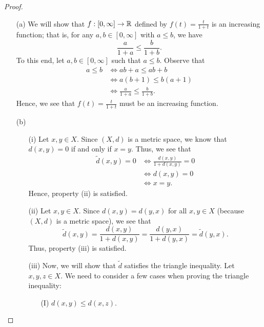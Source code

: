 \documentclass[a4paper]{article}
\begin{document}
\begin{proof}
\begin{enumerate}
    \item[(a)] We will show that \( f: [0,\infty ] \to \mathbb{R}  \) defined by \( f(t) = \frac{ t  }{  1 + t }  \) is an increasing function; that is, for any \( a,b \in [0,\infty ] \) with \( a \leq b  \), we have
        \[  \frac{  a  }{ 1 + a  }  \leq \frac{ b  }{ 1 + b }. \]
        To this end, let \( a,b \in [0,\infty ] \) such that \( a \leq b  \). Observe that
            \begin{align*}
                a \leq  b  &\Longleftrightarrow ab + a \leq ab +  b  \\
                        &\Longleftrightarrow a (b + 1) \leq b (a + 1) \\
                        &\Longleftrightarrow \frac{ a  }{ 1 + a  }  \leq \frac{ b }{  1 + b } .
            \end{align*}
            Hence, we see that \( f(t) = \frac{ t }{ 1+ t }  \) must be an increasing function.
        \item[(b)] 
            \begin{enumerate}
        \item[(i)] Let \( x,y \in X  \). Since \( (X,d) \) is a metric space, we know that \( d(x,y) = 0  \) if and only if \( x = y  \). Thus, we see that  
            \begin{align*}
                \tilde{d}(x,y) = 0 &\Longleftrightarrow \frac{ d(x,y) }{ 1 + d(x,y)  } = 0 \\
                           &\Longleftrightarrow d(x,y) = 0 \\
                           &\Longleftrightarrow x = y.
            \end{align*}
            Hence, property (ii) is satisfied.
        \item[(ii)] Let \( x,y \in X  \). Since \( d(x,y) = d(y,x) \) for all \( x,y \in X  \) (because \( (X,d) \) is a metric space), we see that  
            \[ \tilde{d}(x,y) = \frac{ d(x,y) }{ 1 + d(x,y) } = \frac{ d(y,x) }{ 1 + d(y,x) }  = \tilde{d}(y,x).  \]
            Thus, property (iii) is satisfied.
        \item[(iii)] Now, we will show that \( \tilde{d} \) satisfies the triangle inequality. Let \( x,y,z \in X  \).
We need to consider a few cases when proving the triangle inequality:
            \begin{enumerate}
                \item[(I)] \( d(x,y) \leq d(x,z) \).

\end{enumerate}
\end{enumerate}
\end{enumerate}
\end{proof}
\end{document}
